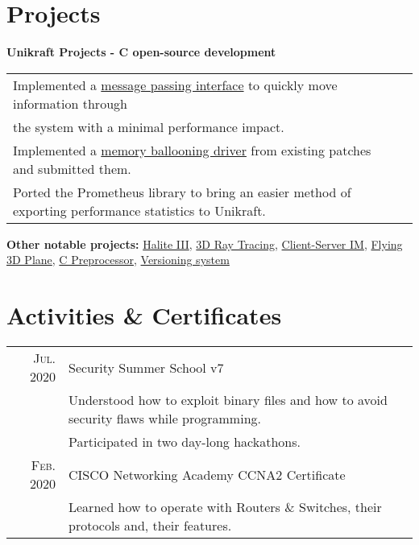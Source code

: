 \documentclass[a4paper,10pt]{article}
\begin{document}
\section{Projects}
\begin{flushleft}
	\textbf{Unikraft Projects - C open-source development}
\end{flushleft}
\begin{tabular}{ll}
	\textbullet\enspace\enspace Implemented a \href{https://github.com/unikraft/unikraft/pull/202}{message passing interface} to quickly move information through \\
	\enspace\enspace\enspace    the system with a minimal performance impact. \\
	\textbullet\enspace\enspace Implemented a \href{https://github.com/unikraft/unikraft/pull/219}{memory ballooning driver} from existing patches and submitted them. \\
	\textbullet\enspace\enspace Ported the Prometheus library to bring an easier method of exporting performance statistics to Unikraft.
\end{tabular}

\begin{flushleft}
\textbf{Other notable projects:} 
	\href{https://github.com/craciunoiuc/Halite-III}{Halite III},
	\href{https://github.com/craciunoiuc/computer-graphics-2}{3D Ray Tracing},
	\href{https://github.com/craciunoiuc/network-protocols/tree/master/Client%20-%20Server}{Client-Server IM},
	\href{https://github.com/craciunoiuc/computer-graphics/tree/master/Source/Teme/Flying%203D%20Plane}{Flying 3D Plane},
	\href{https://github.com/craciunoiuc/operating-systems/tree/master/1-multi}{C Preprocessor},
	\href{https://github.com/craciunoiuc/oop-homework/tree/master/Version%20Control%20System}{Versioning system}
\end{flushleft}

\section{Activities \& Certificates}
\begin{tabular}{rl}
	\textsc{Jul.} 2020 & Security Summer School v7 \\&
		\textbullet\enspace\enspace Understood how to exploit binary files and how to avoid security flaws while programming. \\&
		\textbullet\enspace\enspace Participated in two day-long hackathons. \\
	\textsc{Feb.} 2020 & CISCO Networking Academy CCNA2 Certificate \\&
		\textbullet\enspace\enspace Learned how to operate with Routers \& Switches, their protocols and, their features.
\end{tabular}
\end{document}
